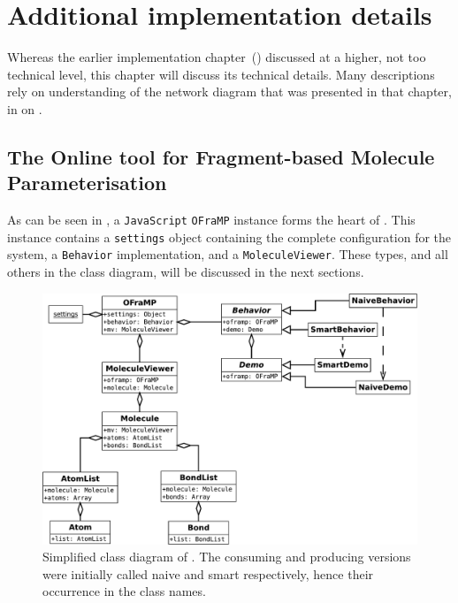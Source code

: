 \chapter[Additional implementation]{Additional implementation details}

Whereas the earlier implementation chapter~() discussed \oframp{} at a higher, not too technical level, this chapter will discuss its technical details. Many descriptions rely on understanding of the network diagram that was presented in that chapter, in  on .



\section[\oframp]{The Online tool for Fragment-based Molecule Parameterisation}
As can be seen in , a \verb|JavaScript| \verb|OFraMP| instance forms the heart of \oframp. This instance contains a \verb|settings| object containing the complete configuration for the system, a \verb|Behavior| implementation, and a \verb|MoleculeViewer|. These types, and all others in the class diagram, will be discussed in the next sections.

\begin{figure}
\center
\includegraphics[width=\textwidth]{img/oframp_class.pdf}
\caption{Simplified class diagram of \oframp. The consuming and producing versions were initially called naive and smart respectively, hence their occurrence in the class names.}
\end{figure}

